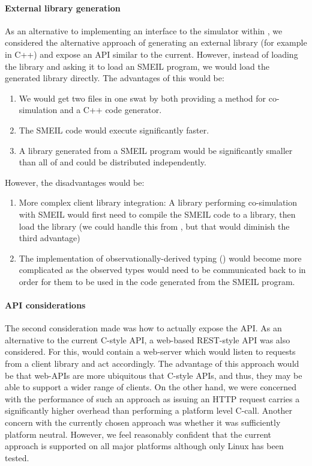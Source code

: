 \paragraph{External library generation}
As an alternative to implementing an interface to the simulator within
\libsme{}, we considered the alternative approach of generating an external
library (for example in C++) and expose an API similar to the current. However,
instead of loading the \libsme{} library and asking it to load an SMEIL program,
we would load the generated library directly. The advantages of this would be:
\begin{enumerate}
\item We would get two files in one swat by both providing a method for
  co-simulation and a C++ code generator.
\item The SMEIL code would execute significantly faster.
\item A library generated from a SMEIL program would be significantly smaller
  than all of \libsme{} and could be distributed independently.
\end{enumerate}
However, the disadvantages would be:
\begin{enumerate}
\item More complex client library integration: A library performing
  co-simulation with SMEIL would first need to compile the SMEIL code to a
  library, then load the library (we could handle this from \libsme{}, but
  that would diminish the third advantage)
\item The implementation of observationally-derived typing ()
  would become more complicated as the observed types would need to be
  communicated back to \libsme{} in order for them to be used in the code
  generated from the SMEIL program.
\end{enumerate}
    
\paragraph{API considerations}
The second consideration made was how to actually expose the API. As an
alternative to the current C-style API, a web-based REST-style API was also
considered. For this, \libsme{} would contain a web-server which would listen to
requests from a client library and act accordingly. The advantage of this
approach would be that web-APIs are more ubiquitous that C-style APIs, and thus,
they may be able to support a wider range of clients. On the other hand, we were
concerned with the performance of such an approach as issuing an HTTP request
carries a significantly higher overhead than performing a platform level
C-call. Another concern with the currently chosen approach was whether it was
sufficiently platform neutral. However, we feel reasonably confident that the
current approach is supported on all major platforms although only Linux has
been tested.


